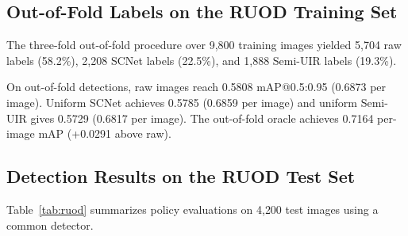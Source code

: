 \documentclass[runningheads]{llncs}
\begin{document}
\subsection{Out-of-Fold Labels on the RUOD Training Set}
\label{sec:res-oof}

The three-fold out-of-fold procedure over 9{,}800 training images yielded 5{,}704 raw labels (58.2\%), 2{,}208 SCNet labels (22.5\%), and 1{,}888 Semi-UIR labels (19.3\%).

On out-of-fold detections, raw images reach 0.5808 mAP@0.5:0.95 (0.6873 per image). Uniform SCNet achieves 0.5785 (0.6859 per image) and uniform Semi-UIR gives 0.5729 (0.6817 per image). The out-of-fold oracle achieves 0.7164 per-image mAP (+0.0291 above raw).

\subsection{Detection Results on the RUOD Test Set}
\label{sec:res-detection}

Table~\ref{tab:ruod} summarizes policy evaluations on 4{,}200 test images using a common detector.
\end{document}
